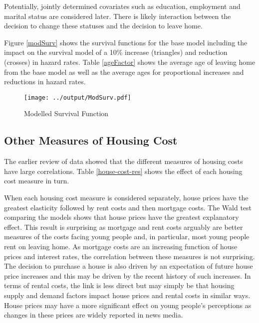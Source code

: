 \documentclass[12pt]{article}
\begin{document}
Potentially, jointly determined covariates such as education, employment and marital status are considered later. There is likely interaction between the decision to change these statuses and the decision to leave home.

Figure \ref{modSurv} shows the survival functions for the base model including the impact on the survival model of a 10\% increase (triangles) and reduction (crosses) in hazard rates. Table \ref{ageFactor} shows the average age of leaving home from the base model as well as the average ages for proportional increases and reductions in hazard rates.

 \begin{figure}[htpb]
   \caption{Modelled Survival Function}
   \centering
   \texttt{[image: ../output/ModSurv.pdf]}
 \end{figure}

 

\subsection{Other Measures of Housing Cost}
The earlier review of data showed that the different measures of housing costs have large correlations. Table \ref{house-cost-res} shows the effect of each housing cost measure in turn.



When each housing cost measure is considered separately, house prices have the greatest elasticity followed by rent costs and then mortgage costs. The Wald test comparing the models shows that house prices have the greatest explanatory effect. This result is surprising as mortgage and rent costs arguably are better measures of the costs facing young people and, in particular, most young people rent on leaving home. As mortgage costs are an increasing function of house prices and interest rates, the correlation between these measures is not surprising. The decision to purchase a house is also driven by an expectation of future house price increases and this may be driven by the recent history of such increases. In terms of rental costs, the link is less direct but may simply be that housing supply and demand factors impact house prices and rental costs in similar ways.  House prices may have a more significant effect on young people's perceptions as changes in these prices are widely reported in news media.
\end{document}
